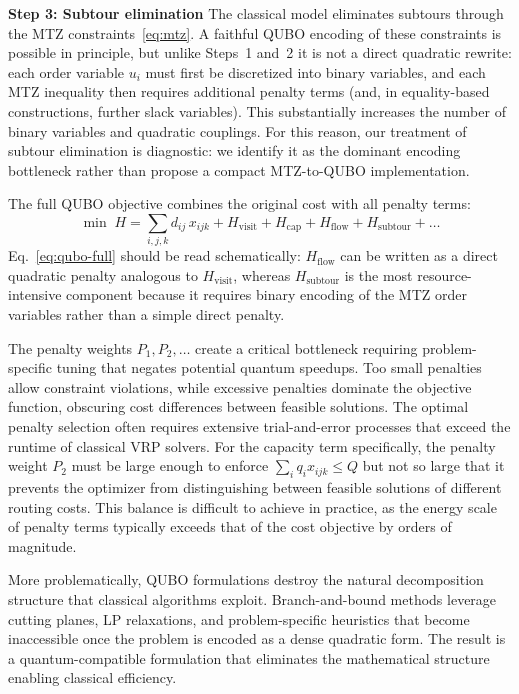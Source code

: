 \documentclass[preprint,3p,12pt,authoryear]{elsarticle}
\begin{document}
{\textbf{Step 3: Subtour elimination} The classical model eliminates subtours through the MTZ constraints~\eqref{eq:mtz}. A faithful QUBO encoding of these constraints is possible in principle, but unlike Steps~1 and~2 it is not a direct quadratic rewrite: each order variable $u_i$ must first be discretized into binary variables, and each MTZ inequality then requires additional penalty terms (and, in equality-based constructions, further slack variables). This substantially increases the number of binary variables and quadratic couplings. For this reason, our treatment of subtour elimination is diagnostic: we identify it as the dominant encoding bottleneck rather than propose a compact MTZ-to-QUBO implementation.

The full QUBO objective combines the original cost with all penalty terms:
\begin{equation}
\min \; H = \sum_{i,j,k} d_{ij}\, x_{ijk} + H_{\text{visit}} + H_{\text{cap}} + H_{\text{flow}} + H_{\text{subtour}} + \ldots \label{eq:qubo-full}
\end{equation}
Eq.~\eqref{eq:qubo-full} should be read schematically: $H_{\text{flow}}$ can be written as a direct quadratic penalty analogous to $H_{\text{visit}}$, whereas $H_{\text{subtour}}$ is the most resource-intensive component because it requires binary encoding of the MTZ order variables rather than a simple direct penalty.

The penalty weights $P_1, P_2, \ldots$ create a critical bottleneck requiring problem-specific tuning that negates potential quantum speedups. Too small penalties allow constraint violations, while excessive penalties dominate the objective function, obscuring cost differences between feasible solutions. The optimal penalty selection often requires extensive trial-and-error processes that exceed the runtime of classical VRP solvers. For the capacity term specifically, the penalty weight $P_2$ must be large enough to enforce $\sum_i q_i x_{ijk} \leq Q$ but not so large that it prevents the optimizer from distinguishing between feasible solutions of different routing costs. This balance is difficult to achieve in practice, as the energy scale of penalty terms typically exceeds that of the cost objective by orders of magnitude.}

More problematically, QUBO formulations destroy the natural decomposition structure that classical algorithms exploit. Branch-and-bound methods leverage cutting planes, LP relaxations, and problem-specific heuristics that become inaccessible once the problem is encoded as a dense quadratic form. The result is a quantum-compatible formulation that eliminates the mathematical structure enabling classical efficiency.
\end{document}
